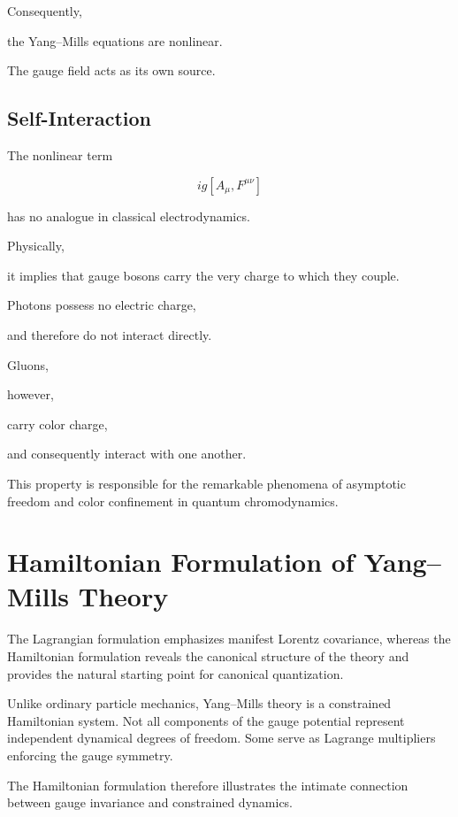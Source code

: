 Consequently,

the Yang--Mills equations are nonlinear.

The gauge field acts as its own source.


\subsection{Self-Interaction}

The nonlinear term

\[
ig[A_\mu,F^{\mu\nu}]
\]

has no analogue in classical electrodynamics.

Physically,

it implies that gauge bosons carry the very charge to which they couple.

Photons possess no electric charge,

and therefore do not interact directly.

Gluons,

however,

carry color charge,

and consequently interact with one another.

This property is responsible for the remarkable phenomena of asymptotic
freedom and color confinement in quantum chromodynamics.



\section{Hamiltonian Formulation of Yang--Mills Theory}

The Lagrangian formulation emphasizes manifest Lorentz covariance,
whereas the Hamiltonian formulation reveals the canonical structure of
the theory and provides the natural starting point for canonical
quantization.

Unlike ordinary particle mechanics, Yang--Mills theory is a constrained
Hamiltonian system. Not all components of the gauge potential represent
independent dynamical degrees of freedom. Some serve as Lagrange
multipliers enforcing the gauge symmetry.

The Hamiltonian formulation therefore illustrates the intimate
connection between gauge invariance and constrained dynamics.

